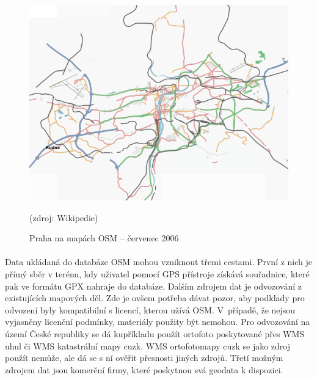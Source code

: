 \documentclass[11pt,a4paper,titlepage,oneside]{book}
\begin{document}
		\begin{figure}[!h]
			\begin{center}
				\includegraphics[width=12cm]{obrazky/Osm-200607-praha.png}
				\caption{Praha na mapách \ac{OSM} -- červenec 2006} (zdroj: Wikipedie\cite{osm_wikipedia_cs})
				\label{fig:praha2006}
			\end{center}
		\end{figure}





		\paragraph{} Data ukládaná do databáze \acl{OSM} mohou vzniknout třemi cestami. První z nich je přímý sběr v terénu, kdy uživatel pomocí GPS přístroje získává souřadnice, které pak ve formátu \ac{GPX} nahraje do databáze. Dalším zdrojem dat je odvozování z existujících mapových děl. Zde je ovšem potřeba dávat pozor, aby podklady pro odvození  byly kompatibilní s licencí, kterou užívá \ac{OSM}. V~případě, že nejsou vyjasněny licenční podmínky, materiály použity být nemohou. Pro odvozování na území České republiky se dá kupříkladu použít ortofoto poskytované přes \ac{WMS} \ac{uhul} či \ac{WMS} katastrální mapy \ac{cuzk}\cite{freemap}. \ac{WMS} ortofotomapy \ac{cuzk} se jako zdroj použít nemůže, ale dá se s ní ověřit přesnosti jiných zdrojů. Třetí možným zdrojem dat jsou komerční firmy, které poskytnou svá geodata k dispozici.
\end{document}

